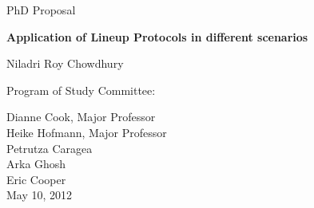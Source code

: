 \documentclass[12]{report}
\begin{document}
\thispagestyle{empty}

\begin{center}

\vspace{2in}

PhD Proposal \\ 

\vspace{.5in}

\Large{\bf Application of Lineup Protocols in different scenarios }

\vspace{1in}

\large{Niladri Roy Chowdhury} 

\vspace{3in}
Program of Study Committee: 

\vspace{.5in}
Dianne Cook, Major Professor \\
Heike Hofmann, Major Professor \\
Petrutza Caragea \\
Arka Ghosh \\
Eric Cooper\\

\vspace{1.5in}
May 10, 2012 
\end{center}

\tableofcontents












%
%



\end{document}
